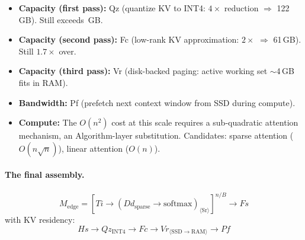 \documentclass[10pt,twocolumn]{article}
\newcommand{\cvalint}[1]{\pgfmathprintnumber[fixed, precision=0, 1000 sep={\,}]{#1}}
\begin{document}
\begin{itemize}[nosep]
\item \textbf{Capacity (first pass):} Qz (quantize KV to INT4: $4\times$ reduction $\Rightarrow$ 122\,GB). Still exceeds \cvalint{\EdgeRAMGB}\,GB.
\item \textbf{Capacity (second pass):} Fc (low-rank KV approximation: $2\times$ $\Rightarrow$ 61\,GB). Still $1.7\times$ over.
\item \textbf{Capacity (third pass):} Vr (disk-backed paging: active working set $\sim$4\,GB fits in RAM).
\item \textbf{Bandwidth:} Pf (prefetch next context window from SSD during compute).
\item \textbf{Compute:} The $O(n^2)$ cost at this scale requires a sub-quadratic attention mechanism, an Algorithm-layer substitution. Candidates: sparse attention ($O(n \sqrt{n})$), linear attention ($O(n)$).
\end{itemize}

\paragraph{The final assembly.}

\begin{equation*}
M_{\text{edge}} = [Ti \rightarrow (Dd_{\text{sparse}} \rightarrow \mathrm{softmax})_{\langle\text{Sr}\rangle}]^{n/B} \rightarrow Fs
\end{equation*}
with KV residency:
\begin{equation*}
Hs \rightarrow Qz_{\text{INT4}} \rightarrow Fc \rightarrow Vr_{\langle\text{SSD} \to \text{RAM}\rangle} \rightarrow Pf
\end{equation*}
\end{document}
